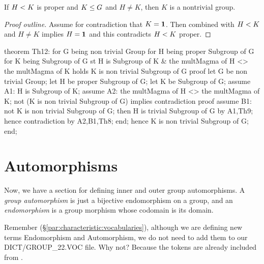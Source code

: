 \begin{theorem}
If $H< K$ is proper and $K\leq G$ and $H\neq K$, then
$K$ is a nontrivial group.
\end{theorem}

\begin{proof}[Proof outline]
  Assume for contradiction that $K=\mathbf{1}$.
  Then combined with $H< K$ and $H\neq K$ implies
  $H=\mathbf{1}$ and this contradicts $H< K$ proper.
\end{proof}

\nwenddocs{}\endmoddef\nwstartdeflinemarkup{}\nwenddeflinemarkup
theorem Th12:
  for G being non trivial Group
  for H being proper Subgroup of G
  for K being Subgroup of G
  st H is Subgroup of K & the multMagma of H <> the multMagma of K
  holds K is non trivial Subgroup of G
proof
  let G be non trivial Group;
  let H be proper Subgroup of G;
  let K be Subgroup of G;
  assume A1: H is Subgroup of K;
  assume A2: the multMagma of H <> the multMagma of K;
  not (K is non trivial Subgroup of G) implies contradiction
  proof
    assume B1: not K is non trivial Subgroup of G;
    then H is trivial Subgroup of G by A1,Th9;
    hence contradiction by A2,B1,Th8;
  end;
  hence K is non trivial Subgroup of G;
end;
\eatline
{}\nwendcode{}%
\section{Automorphisms}\label{sec:characteristic:automorphism}
Now, we have a section for defining inner and outer group
automorphisms. A \emph{group automorphism} is just a bijective endomorphism on
a group, and an \emph{endomorphism} is a group morphism whose codomain
is its domain.

Remember (\S\ref{par:characteristic:vocabularies}), although we are
defining new terms {\Tt{}Endomorphism\nwendquote} and {\Tt{}Automorphism\nwendquote}, we do not need
to add them to our {\Tt{}DICT/GROUP{\_}22.VOC\nwendquote} file. Why not? Because the tokens
are already included from .

